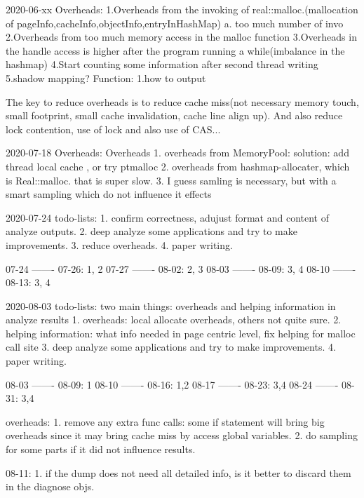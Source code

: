 2020-06-xx
Overheads:
1.Overheads from the invoking of real::malloc.(mallocation of pageInfo,cacheInfo,objectInfo,entryInHashMap)
a. too much number of invo
2.Overheads from too much memory access in the malloc function
3.Overheads in the handle access is higher after the program running a while(imbalance in the hashmap)
4.Start counting some information after second thread writing
5.shadow mapping?
Function:
1.how to output

The key to reduce overheads is to reduce cache miss(not necessary memory touch, small footprint, small cache invalidation, cache line align up).
And also reduce lock contention, use of lock and also use of CAS...


2020-07-18 Overheads:
Overheads
1. overheads from MemoryPool:
solution: add thread local cache , or try ptmalloc
2. overheads from hashmap-allocater, which is Real::malloc. that is super slow.
3. I guess samling is necessary, but with a smart sampling which do not influence it effects




2020-07-24 todo-lists:
1. confirm correctness, adujust format and content of analyze outputs.
2. deep analyze some applications and try to make improvements.
3. reduce overheads.
4. paper writing.

07-24 ------- 07-26: 1, 2
07-27 ------- 08-02: 2, 3
08-03 ------- 08-09: 3, 4
08-10 ------- 08-13: 3, 4

2020-08-03 todo-lists:
two main things: overheads and helping information in analyze results
    1. overheads: local allocate overheads, others not quite sure.
    2. helping information: what info needed in page centric level, fix helping for malloc call site
    3. deep analyze some applications and try to make improvements.
    4. paper writing.

08-03 ------- 08-09: 1
08-10 ------- 08-16: 1,2
08-17 ------- 08-23: 3,4
08-24 ------- 08-31: 3,4


overheads:
    1. remove any extra func calls: some if statement will bring big overheads since it may bring cache miss by access global variables.
    2. do sampling for some parts if it did not influence results.


08-11:
    1. if the dump does not need all detailed info, is it better to discard them in the diagnose objs.